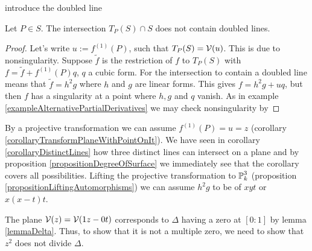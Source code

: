 \begin{lemma}
\begin{todo}\item introduce the doubled line \end{todo}
Let $P \in S$. The intersection $T_P(S) \cap S$ does not contain doubled lines.
\end{lemma}
\begin{proof}

Let's write $u := f^{(1)}(P)$, such that $T_P(S) = \operatorname{\mathcal V}(u)$.
This is due to nonsingularity. Suppose $\widetilde f$ is the restriction of $f$ to $T_P(S)$ with $f = \widetilde f + f^{(1)}(P)q$, $q$ a cubic form.
For the intersection to contain a doubled line means that $\widetilde f = h^2g$ where $h$ and $g$ are linear forms.
This gives $f = h^2g + uq$, but then $f$ has a singularity at a point where $h,g$ and $q$ vanish.
As in example \ref{exampleAlternativePartialDerivatives} we may check nonsingularity by 
\end{proof}

By a projective transformation we can assume $f^{(1)}(P) = u = z$ (corollary \ref{corollaryTransformPlaneWithPointOnIt}).
We have seen in corollary \ref{corollaryDistinctLines} how three distinct lines can intersect on a plane and by proposition \ref{propositionDegreeOfSurface} we immediately see that the corollary covers all possibilities.
Lifting the projective transformation to $\operatorname{\mathbb P}^3_k$ (proposition \ref{propositionLiftingAutomorphisms}) we can assume $h^2g$ to be of $xyt$ or $x(x-t)t$.

The plane $\operatorname{\mathcal V}(z) = \operatorname{\mathcal V}(1z- 0t)$ corresponds to $\Delta$ having a zero at $[0:1]$ by lemma \ref{lemmaDelta}.
Thus, to show that it is not a multiple zero, we need to show that $z^2$ does not divide $\Delta$.

